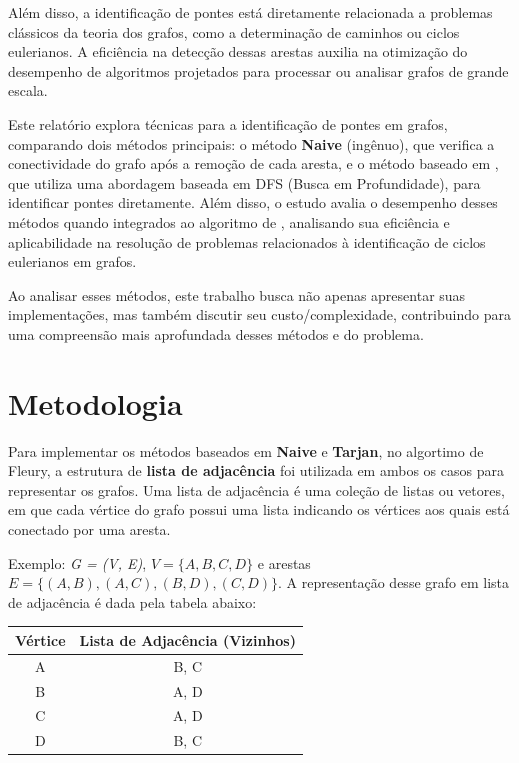 \documentclass{sbc2023}%
\begin{document}
Além disso, a identificação de pontes está diretamente relacionada a problemas clássicos da teoria dos grafos, como a determinação de caminhos ou ciclos eulerianos. A eficiência na detecção dessas arestas auxilia na otimização do desempenho de algoritmos projetados para processar ou analisar grafos de grande escala.

Este relatório explora técnicas para a identificação de pontes em grafos, comparando dois métodos principais: o método \textbf{Naive} (ingênuo), que verifica a conectividade do grafo após a remoção de cada aresta, e o método baseado em  \textbf{\cite{ref5}}, que utiliza uma abordagem baseada em DFS (Busca em Profundidade), para identificar pontes diretamente. Além disso, o estudo avalia o desempenho desses métodos quando integrados ao algoritmo de \cite{ref6}, analisando sua eficiência e aplicabilidade na resolução de problemas relacionados à identificação de ciclos eulerianos em grafos.

Ao analisar esses métodos, este trabalho busca não apenas apresentar suas implementações, mas também discutir seu custo/complexidade, contribuindo para uma compreensão mais aprofundada desses métodos e do problema.

\section{Metodologia}
Para implementar os métodos baseados em \textbf{Naive} e \textbf{Tarjan}, no algortimo de Fleury, a estrutura de \textbf{lista de adjacência} foi utilizada em ambos os casos para representar os grafos. Uma lista de adjacência é uma coleção de listas ou vetores, em que cada vértice do grafo possui uma lista indicando os vértices aos quais está conectado por uma aresta.


Exemplo: \textit{G = (V, E)}, \( V= \{A, B, C, D\} \) e arestas \( E = \{(A, B), (A, C), (B, D), (C, D)\} \). A representação desse grafo em lista de adjacência é dada pela tabela abaixo:

\begin{center}
\begin{tabular}{|c|c|}
\hline
\textbf{Vértice} & \textbf{Lista de Adjacência (Vizinhos)} \\
\hline
A & B, C \\
\hline
B & A, D \\
\hline
C & A, D \\
\hline
D & B, C \\
\hline
\end{tabular}
\end{center}
\end{document}
